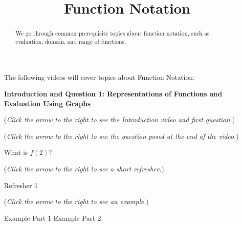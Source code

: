 \documentclass{ximera}
\title[Prerequisite Videos: ]{Function Notation}
\begin{document}
\begin{abstract}
  We go through common prerequisite topics about function notation, such as
  evaluation, domain, and range of functions.
\end{abstract}
\maketitle

The following videos will cover topics about Function Notation:

\textbf{Introduction and Question 1: Representations of 
Functions and Evaluation Using Graphs}
\begin{question}
\begin{flushright}
{\color{blue}(\emph{Click the arrow to the right to see the Introduction video and first question.})}
\end{flushright}
\begin{center}
\begin{expandable}
{\color{blue}(\emph{Click the arrow to the right to see the question
posed at the end of the video.})}
\begin{expandable}
What is $f(2)$?
\begin{multipleChoice}
\end{multipleChoice}
\begin{flushright}
{\color{blue}(\emph{Click the arrow to the right to see a short refresher.})}
\end{flushright}
\begin{expandable}
Refresher 1
\end{expandable}
\begin{flushright}
{\color{blue}(\emph{Click the arrow to the right to see an example.})}
\end{flushright}
\begin{expandable}
Example Part 1
Example Part 2
\end{expandable}
\end{expandable}
\end{expandable}
\end{center}
\end{question}
\end{document}
